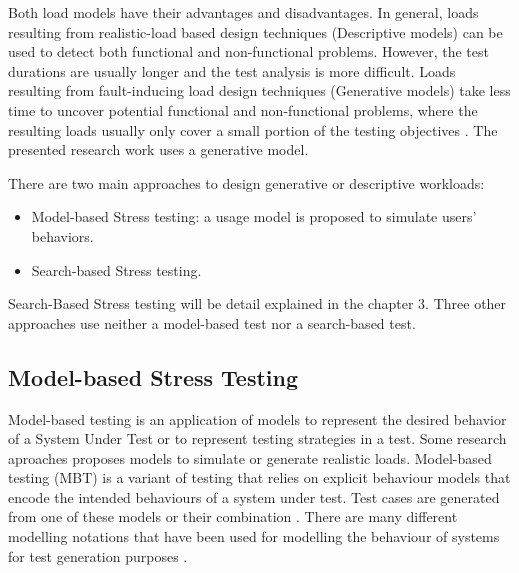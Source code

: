 \documentclass[espaco=umemeio,chapter=TITLE,twoside,openright]{abnt}
\begin{document}
Both load models have their advantages and disadvantages. In general, loads resulting from realistic-load based design techniques (Descriptive models) can be used to detect both functional and non-functional problems. However, the test durations are usually longer and the test analysis is more difficult. Loads resulting from fault-inducing load design techniques (Generative models) take less time to uncover potential functional and non-functional problems, where the resulting loads usually only cover a small portion of the testing objectives \cite{Jiang2010}. The presented research work uses a generative model.


There are two main approaches to design generative or descriptive workloads:

\begin{itemize}
\item Model-based Stress testing: a usage model is proposed to simulate users’ behaviors.
\item Search-based Stress testing.
\end{itemize}


Search-Based Stress testing will be detail explained in the chapter 3. Three other approaches use neither a model-based test nor a search-based test.

\subsection{Model-based Stress Testing}

Model-based testing is an application  of models to represent the desired behavior of a System Under Test or to represent testing strategies in a test. Some research aproaches proposes models to simulate or  generate realistic loads. Model-based testing (MBT) is a variant of testing that relies on explicit behaviour models that encode the intended behaviours of a system under test. Test cases are generated from one of these models or their combination \cite{MarkUtting2012} \cite{Bertolino2008}. There are many different modelling notations that have been used for modelling the behaviour of systems for test generation purposes \cite{MarkUtting2012} \cite{Hierons2009}.
\end{document}
